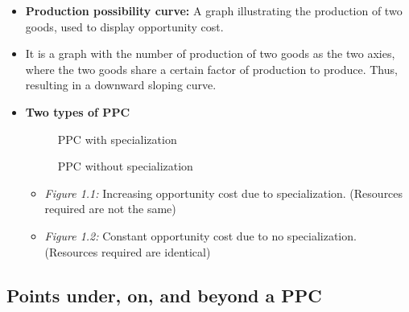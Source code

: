 \documentclass[11pt, a4paper, openany]{book}
\begin{document}
\begin{itemize}\itemsep0em
    \item \textbf{Production possibility curve:} A graph illustrating the production of two goods, used to display opportunity cost.
    \item It is a graph with the number of production of two goods as the two axies, where the two goods share a certain factor of
        production to produce. Thus, resulting in a downward sloping curve.
    \item \textbf{Two types of PPC}
        \begin{figure}[!h]
            \centering
            \begin{minipage}{0.45\textwidth}
                \caption{PPC with specialization}
            \end{minipage}
            \hspace{0.3cm}
            \begin{minipage}{0.45\textwidth}
                \caption{PPC without specialization}
            \end{minipage}
        \end{figure}
        \begin{itemize}\itemsep0em
            \item \textit{Figure 1.1:} Increasing opportunity cost due to specialization. (Resources required are not the same)
            \item \textit{Figure 1.2:} Constant opportunity cost due to no specialization. (Resources required are identical)
        \end{itemize}
\end{itemize}

\subsection{Points under, on, and beyond a PPC}
\end{document}
